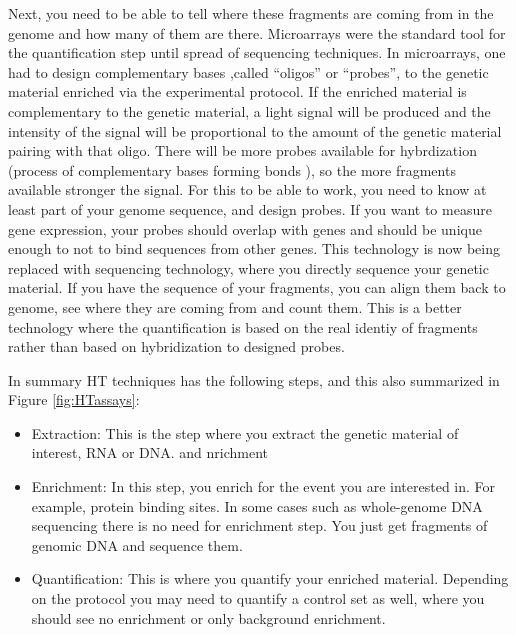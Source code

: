 \documentclass[12pt,]{krantz}
\providecommand{\tightlist}{%
  \setlength{\itemsep}{0pt}\setlength{\parskip}{0pt}}
\theoremstyle{definition}
\theoremstyle{definition}
\theoremstyle{definition}
\theoremstyle{remark}
\begin{document}
Next, you need to be able to tell where these fragments are coming from
in the genome and how many of them are there. Microarrays were the
standard tool for the quantification step until spread of sequencing
techniques. In microarrays, one had to design complementary bases
,called ``oligos'' or ``probes'', to the genetic material enriched via
the experimental protocol. If the enriched material is complementary to
the genetic material, a light signal will be produced and the intensity
of the signal will be proportional to the amount of the genetic material
pairing with that oligo. There will be more probes available for
hybrdization (process of complementary bases forming bonds ), so the
more fragments available stronger the signal. For this to be able to
work, you need to know at least part of your genome sequence, and design
probes. If you want to measure gene expression, your probes should
overlap with genes and should be unique enough to not to bind sequences
from other genes. This technology is now being replaced with sequencing
technology, where you directly sequence your genetic material. If you
have the sequence of your fragments, you can align them back to genome,
see where they are coming from and count them. This is a better
technology where the quantification is based on the real identiy of
fragments rather than based on hybridization to designed probes.

In summary HT techniques has the following steps, and this also
summarized in Figure \ref{fig:HTassays}:

\begin{itemize}
\tightlist
\item
  Extraction: This is the step where you extract the genetic material of
  interest, RNA or DNA. and nrichment
\item
  Enrichment: In this step, you enrich for the event you are interested
  in. For example, protein binding sites. In some cases such as
  whole-genome DNA sequencing there is no need for enrichment step. You
  just get fragments of genomic DNA and sequence them.
\item
  Quantification: This is where you quantify your enriched material.
  Depending on the protocol you may need to quantify a control set as
  well, where you should see no enrichment or only background
  enrichment.
\end{itemize}
\end{document}
